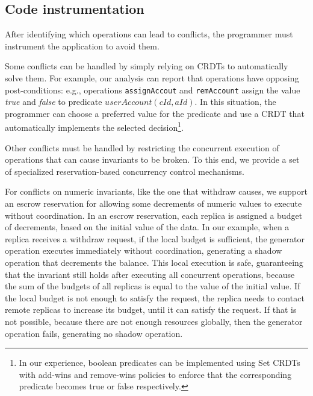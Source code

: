 \subsection{Code instrumentation}
After identifying which operations can lead to conflicts, the programmer
must instrument the application to avoid them.

Some conflicts can be handled by simply relying on CRDTs to automatically solve
them.
For example, our analysis can report that operations have 
opposing post-conditions: e.g., operations {\tt assignAccout} and {\tt remAccount}
assign the value \textit{true} and \textit{false} to predicate $userAccount(cId, aId)$.
In this situation, the programmer can choose a preferred value for the
predicate and use a CRDT that automatically implements the selected
decision\footnote{In our
experience, boolean predicates can be implemented using Set CRDTs with
add-wins and remove-wins policies to enforce that the corresponding 
predicate becomes true or false
respectively.}.

Other conflicts must be handled by restricting the concurrent execution of 
operations that can cause invariants to be broken. To this end, we provide a set 
of specialized reservation-based concurrency control mechanisms.

For conflicts on numeric invariants, like the one that withdraw causes,
we support an escrow reservation for allowing some decrements of numeric 
values to execute without coordination.
In an escrow reservation, each replica is assigned a budget of decrements,
based on the initial value of the data.
In our example, when a replica receives a withdraw request, if the local 
budget is sufficient, the generator operation executes immediately 
without coordination, generating a shadow operation that decrements 
the balance.
This local execution is safe, guaranteeing that the invariant still holds
after executing all concurrent operations, because the sum 
of the budgets of all replicas is equal to the value of the initial value.
If the local budget is not enough to satisfy the request, the replica needs to
contact remote replicas to increase its budget, until it can satisfy the request.
If that is not possible, because there are not enough resources globally,
then the generator operation fails, generating no shadow operation.

